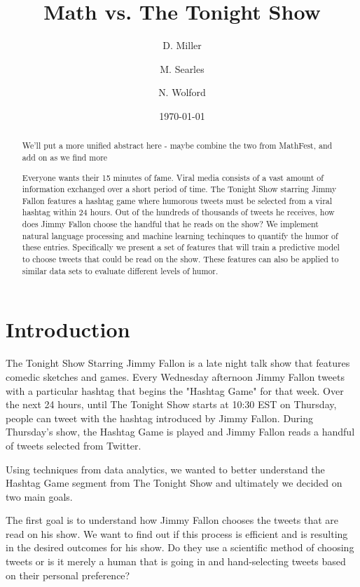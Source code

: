 \documentclass[titlepage]{article}
\begin{document}
\title{Math vs. The Tonight Show}
\author{D. Miller \and M. Searles \and N. Wolford} %
\date{\today}
\maketitle

\begin{abstract}
We'll put a more unified abstract here - maybe combine the two from MathFest, and add on as we find more

Everyone wants their 15 minutes of fame. Viral media consists of a vast amount of information
exchanged over a short period of time. The Tonight Show starring Jimmy Fallon features a hashtag
game where humorous tweets must be selected from a viral hashtag within 24 hours. Out of
the hundreds of thousands of tweets he receives, how does Jimmy Fallon choose the handful that
he reads on the show? We implement natural language processing and machine learning techinques to 
quantify the humor of these entries. Specifically we present a set of features that will train a predictive model
to choose tweets that could be read on the show. These features can also be applied to similar data sets to evaluate 
different levels of humor.

\end{abstract}

\section{Introduction}


The Tonight Show Starring Jimmy Fallon is a late night talk show that features comedic sketches and games. Every Wednesday afternoon Jimmy Fallon tweets with a particular hashtag that begins the "Hashtag Game" for that week. Over the next 24 hours, until The Tonight Show starts at 10:30 EST on Thursday, people can tweet with the hashtag introduced by Jimmy Fallon. During Thursday's show, the Hashtag Game is played and Jimmy Fallon reads a handful of tweets selected from Twitter. 

Using techniques from data analytics, we wanted to better understand the Hashtag Game segment from The Tonight Show and ultimately we decided on two main goals.

The first goal is to understand how Jimmy Fallon chooses the tweets that are read on his show. We want to find out if this process is efficient and is resulting in the desired outcomes for his show. Do they use a scientific method of choosing tweets or is it merely a human that is going in and hand-selecting tweets based on their personal preference?
\end{document}
